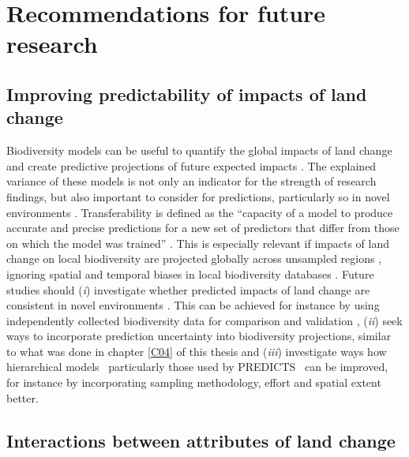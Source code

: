 \section{Recommendations for future research}
\label{C06_04}
\subsection{Improving predictability of impacts of land change}
\label{C06_0401}

Biodiversity models can be useful to quantify the global impacts of land change and create predictive projections of future expected impacts \citep{Purvis2018}. The explained variance of these models is not only an indicator for the strength of research findings, but also important to consider for predictions, particularly so in novel environments \citep{Yates2018}. Transferability is defined as the “capacity of a model to produce accurate and precise predictions for a new set of predictors that differ from those on which the model was trained” \citep{Yates2018}. This is especially relevant if impacts of land change on local biodiversity are projected globally across unsampled regions \citep{Newbold2015,Purvis2018}, ignoring spatial and temporal biases in local biodiversity databases \citep{Martin2012,Hudson2014,Gonzalez2016}. Future studies should (\textit{i}) investigate whether predicted impacts of land change are consistent in novel environments \citep{Yates2018}. This can be achieved for instance by using independently collected biodiversity data for comparison and validation \citep{Jung2016}, (\textit{ii}) seek ways to incorporate prediction uncertainty into biodiversity projections, similar to what was done in chapter \ref{C04} of this thesis and (\textit{iii}) investigate ways how hierarchical models \textendash\ particularly those used by PREDICTS \citep{Purvis2018} \textendash\ can be improved, for instance by incorporating sampling methodology, effort and spatial extent better.  

\subsection{Interactions between attributes of land change}
\label{C06_0402}

